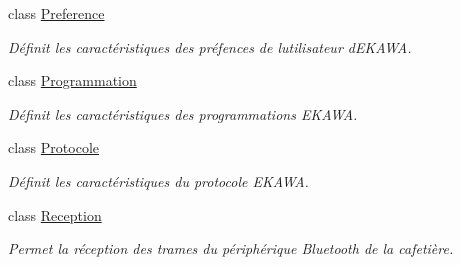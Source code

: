 \begin{DoxyCompactItemize}
class \hyperlink{classcom_1_1example_1_1ekawa_1_1_preference}{Preference}
\begin{DoxyCompactList}\small\item\em Définit les caractéristiques des préfences de l\textquotesingle{}utilisateur d\textquotesingle{}E\+K\+A\+WA. \end{DoxyCompactList}\item 
class \hyperlink{classcom_1_1example_1_1ekawa_1_1_programmation}{Programmation}
\begin{DoxyCompactList}\small\item\em Définit les caractéristiques des programmations E\+K\+A\+WA. \end{DoxyCompactList}\item 
class \hyperlink{classcom_1_1example_1_1ekawa_1_1_protocole}{Protocole}
\begin{DoxyCompactList}\small\item\em Définit les caractéristiques du protocole E\+K\+A\+WA. \end{DoxyCompactList}\item 
class \hyperlink{classcom_1_1example_1_1ekawa_1_1_reception}{Reception}
\begin{DoxyCompactList}\small\item\em Permet la réception des trames du périphérique Bluetooth de la cafetière. \end{DoxyCompactList}\end{DoxyCompactItemize}
